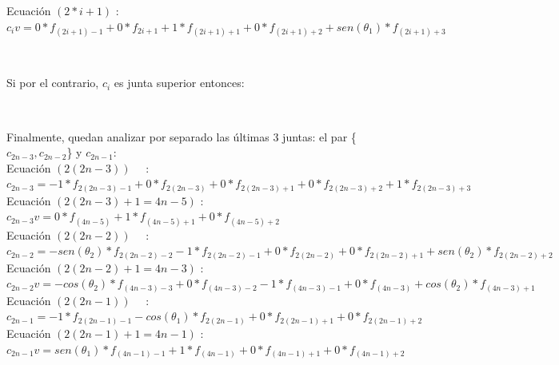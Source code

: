 Ecuación $(2*i+1)$ : $c_{i} v = 0*f_{(2i+1)-1} + 0*f_{2i+1} + 1*f_{(2i+1)+1} + 0*f_{(2i+1)+2} + sen(\theta_{1})*f_{(2i+1)+3}$

~

Si por el contrario, $c_{i}$ es junta superior entonces:


~

Finalmente, quedan analizar por separado las últimas 3 juntas: el par \{$c_{2n-3},c_{2n-2}$\} y $c_{2n-1}$: \\

Ecuación $(2(2n-3))$ \ \ : $c_{2n-3} = -1*f_{2(2n-3)-1} + 0*f_{2(2n-3)} + 0*f_{2(2n-3)+1} + 0*f_{2(2n-3)+2} + 1*f_{2(2n-3)+3} $ \\

Ecuación $(2(2n-3)+1 = 4n-5)$ : $c_{2n-3} v = 0*f_{(4n-5)} + 1*f_{(4n-5)+1} + 0*f_{(4n-5)+2} $ \\

Ecuación $(2(2n-2))$ \ \ : $c_{2n-2} = -sen(\theta_{2})*f_{2(2n-2)-2} - 1*f_{2(2n-2)-1} + 0*f_{2(2n-2)} + 0*f_{2(2n-2)+1} + sen(\theta_{2})*f_{2(2n-2)+2} $ \\

Ecuación $(2(2n-2)+1 = 4n-3)$ : $c_{2n-2} v = -cos(\theta_{2})*f_{(4n-3)-3} + 0*f_{(4n-3)-2} - 1*f_{(4n-3)-1} + 0*f_{(4n-3)} + cos(\theta_{2})*f_{(4n-3)+1} $ \\

Ecuación $(2(2n-1))$ \ \ : $c_{2n-1} = -1*f_{2(2n-1)-1} - cos(\theta_{1})*f_{2(2n-1)} + 0*f_{2(2n-1)+1} + 0*f_{2(2n-1)+2}$ \\

Ecuación $(2(2n-1)+1 = 4n-1)$ : $c_{2n-1} v = sen(\theta_{1})*f_{(4n-1)-1} + 1*f_{(4n-1)} + 0*f_{(4n-1)+1} + 0*f_{(4n-1)+2}$ \\


